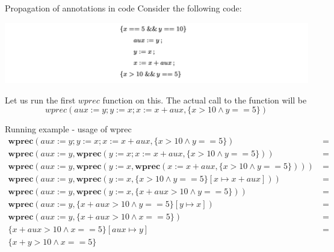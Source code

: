 \documentclass[aspectratio=169]{beamer}
\begin{document}
%

\begin{slide}{Propagation of annotations in code}
 Consider the following code:
\begin{center}
\includegraphics[scale=0.5]{images/ex_code}  
\end{center}
Let us run the first $wprec$ function on this. The actual call to the function will be
$$wprec(aux := y; y := x; x := x + aux, \{x > 10 \land y == 5\})$$ 
\end{slide}

\begin{slide}{Running example - usage of wprec}
\begin{align*}
  \textbf{wprec}(aux := y; y := x; x := x + aux, \{x > 10 \land y == 5\}) & ~=~ \\
  \textbf{wprec}(aux := y,\textbf{wprec}(y := x; x := x + aux, \{x > 10 \land y == 5\})) & ~=~ \\
  \textbf{wprec}(aux := y,\textbf{wprec}(y := x,\textbf{wprec}(x := x + aux, \{x > 10 \land y == 5\}))) & ~=~ \\
  \textbf{wprec}(aux := y,\textbf{wprec}(y := x,\{x > 10 \land y == 5\}[x \mapsto x + aux])) & ~=~ \\
  \textbf{wprec}(aux := y,\textbf{wprec}(y := x,\{x + aux > 10 \land y == 5\})) & ~=~ \\
  \textbf{wprec}(aux := y,\{x + aux > 10 \land y == 5\}[y \mapsto x]) & ~=~ \\
  \textbf{wprec}(aux := y,\{x + aux > 10 \land x == 5\}) & ~=~ \\
  \{x + aux > 10 \land x == 5\}[aux \mapsto y] & ~=~ \\
  \{x + y > 10 \land x == 5\}
\end{align*}
\end{slide}
\end{document}
